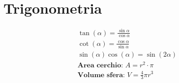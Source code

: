 \section{Trigonometria}
\begin{gather*}
 \tan (\alpha) = \frac{\sin \alpha}{\cos \alpha} \\
 \cot (\alpha) = \frac{\cos \alpha}{\sin \alpha} \\
 \sin (\alpha) \cos (\alpha) = \sin (2 \alpha) \\
 \textbf{Area cerchio: } A = r^2 \cdot \pi \\
 \textbf{Volume sfera: } V = \frac{4}{3} \pi r^3
\end{gather*}